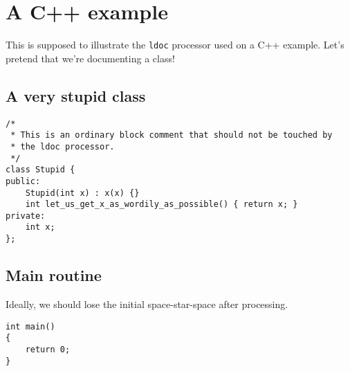 \section{A C++ example}

This is supposed to illustrate the \verb|ldoc| processor used on a C++
example.  Let's pretend that we're documenting a class!

\subsection{A very stupid class}

\begin{verbatim}
/*
 * This is an ordinary block comment that should not be touched by
 * the ldoc processor.
 */
class Stupid {
public:
    Stupid(int x) : x(x) {}
    int let_us_get_x_as_wordily_as_possible() { return x; }
private:
    int x;
};

\end{verbatim}
\subsection{Main routine}

Ideally, we should lose the initial space-star-space after processing.

\begin{verbatim}
int main()
{
    return 0;
}
\end{verbatim}

